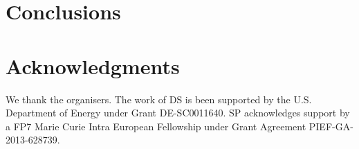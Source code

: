 \section{Conclusions}
\label{sec:psunc:conclusions}




\section*{Acknowledgments}

We thank the organisers.
The work of DS is been supported by the U.S. Department of Energy under Grant
DE-SC0011640.
SP acknowledges support by a FP7 Marie Curie Intra European
Fellowship under Grant Agreement PIEF-GA-2013-628739.
